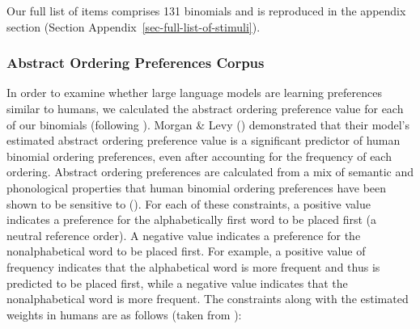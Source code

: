 \documentclass[
  12pt,
  letterpaper,
]{scrreport}
\begin{document}
Our full list of items comprises 131 binomials and is reproduced in the
appendix section (Section Appendix~\ref{sec-full-list-of-stimuli}).

\subsubsection{Abstract Ordering Preferences
Corpus}\label{sec-abstract-ordering-preferences-corpus}

In order to examine whether large language models are learning
preferences similar to humans, we calculated the abstract ordering
preference value for each of our binomials (following
). Morgan \& Levy
() demonstrated
that their model's estimated abstract ordering preference value is a
significant predictor of human binomial ordering preferences, even after
accounting for the frequency of each ordering. Abstract ordering
preferences are calculated from a mix of semantic and phonological
properties that human binomial ordering preferences have been shown to
be sensitive to (). For each of these constraints, a positive value
indicates a preference for the alphabetically first word to be placed
first (a neutral reference order). A negative value indicates a
preference for the nonalphabetical word to be placed first. For example,
a positive value of frequency indicates that the alphabetical word is
more frequent and thus is predicted to be placed first, while a negative
value indicates that the nonalphabetical word is more frequent. The
constraints along with the estimated weights in humans are as follows
(taken from ):
\end{document}
